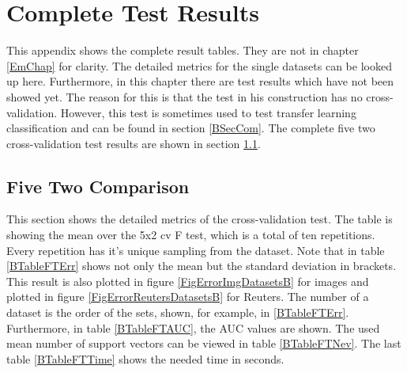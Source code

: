 \chapter{Complete Test Results}\label{appaB}
This appendix shows the complete result tables.
They are not in chapter \ref{EmChap} for clarity.
The detailed metrics for the single datasets can be looked up here.
Furthermore, in this chapter there are test results which have not been showed yet. 
The reason for this is that the test in his construction has no cross-validation.
However, this test is sometimes used to test transfer learning classification \cite{Long.} and can be found in section \ref{BSecCom}.
The complete five two cross-validation test results are shown in section \ref{BSecFT}.

\section{Five Two Comparison}\label{BSecFT}
This section shows the detailed metrics of the cross-validation test.
The table is showing the mean over the 5x2 cv F test, which is a total of ten repetitions.
Every repetition has it's unique sampling from the dataset. 
Note that in table \ref{BTableFTErr} shows not only the mean but the standard deviation in brackets.
This result is also plotted in figure \ref{FigErrorImgDatasetsB} for images and plotted in figure \ref{FigErrorReutersDatasetsB} for Reuters.
The number of a dataset is the order of the sets, shown, for example, in \ref{BTableFTErr}.
Furthermore, in table \ref{BTableFTAUC}, the \acs{AUC} values are shown. 
The used mean number of support vectors can be viewed in table \ref{BTableFTNev}.
The last table \ref{BTableFTTime} shows the needed time in seconds.  
